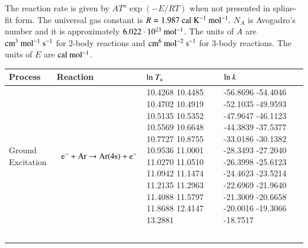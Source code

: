 \documentclass{warpdoc}
\renewcommand{\fontsizetable}{\footnotesize\scalefont{0.9}}
\begin{document}
\begin{table}[!ht]
\begin{threeparttable}
\begin{tabular*}{1.05\textwidth}{l@{\extracolsep{\fill}}lllccr}
 
    \bottomrule
    \end{tabular*}
\begin{tablenotes}
\item[{a}] The reaction rate is given by $A T^n \exp(-E/RT)$ when not presented in spline-fit form. The universal gas constant is $R = 1.987~{\rm cal~K^{-1}~mol^{-1}}.$ $N_A$ is Avogadro's number and it is approximately $6.022 \cdot 10^{23}~{\rm mol^{-1}}$. The units of $A$ are $\rm cm^3~ mol^{-1} ~s^{-1}$ for 2-body reactions and $\rm cm^6 ~mol^{-2} ~ s^{-1}$ for 3-body reactions. The units of $E$ are ${\rm cal~mol^{-1}}$.


\end{tablenotes}
   \end{threeparttable}
\end{table}


\begin{table}[!ht]
  \center\fontsizetable
  
  \begin{threeparttable}
    \label{tab:ei_splines_Ar}
    \fontsizetable
 
    \begin{tabular*}{\textwidth}{@{}l@{\extracolsep{\fill}}lll@{}}
    
    \toprule
Process & Reaction ~ & ${\rm ln}~T_{\rm e}$ & ${\rm ln}~k$ \\
        \midrule
        

Ground Excitation & ~{$\rm e^- + Ar \rightarrow Ar(4s) + e^-$  } &   \begin{minipage}[t]{0.28\textwidth}\raggedright  
      10.4268
      10.4485
      10.4702
      10.4919
      10.5135
      10.5352
      10.5569
      10.6648
      10.7727
      10.8755
      10.9536
      11.0001
      11.0270
      11.0510
      11.0942
      11.1474
      11.2135
      11.2963
      11.4088
      11.5797
      11.8688
      12.4147
      13.2881
 \end{minipage}  & \begin{minipage}[t]{0.28\textwidth}\raggedright 
      -56.8696
      -54.4046
      -52.1035
      -49.9593
      -47.9647
      -46.1123
      -44.3839
      -37.5377
      -33.0186
      -30.1382
      -28.3493
      -27.2040
      -26.3998
      -25.6123
      -24.4623
      -23.5214
      -22.6969
      -21.9640
      -21.3009
      -20.6658
      -20.0016
      -19.3066
      -18.7517
\end{minipage} \\         
~\\


\end{tabular*}
\end{threeparttable}
\end{table}
\end{document}
